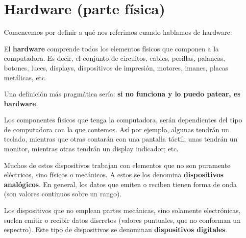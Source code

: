 \section{Hardware (parte física)}

Comencemos por definir a qué nos referimos cuando hablamos de hardware:

\begin{definition}
    El \textbf{hardware} comprende todos los elementos físicos que componen a la
    computadora. Es decir, el conjunto de circuitos, cables, perillas, palancas,
    botones, luces, displays, dispositivos de impresión, motores, imanes, placas
    metálicas, etc.\autocite[vid. p.12]{gookin_2005}
\end{definition}

Una definición más pragmática sería: \textbf{si no funciona y lo puedo patear,
es hardware}.

Los componentes físicos que tenga la computadora, serán dependientes del tipo de
computadora con la que contemos. Así por ejemplo, algunas tendrán un teclado,
mientras que otras contarán con una pantalla táctil; unas tendrán un monitor,
mientras otras tendrán un display indicador; etc.

Muchos de estos dispositivos trabajan con elementos que no son puramente
eléctricos, sino físicos o mecánicos. A estos se los denomina
\textbf{dispositivos analógicos}. En general, los datos que emiten o reciben
tienen forma de onda (son valores continuos sobre un rango).

Los dispositivos que no emplean partes mecánicas, sino solamente electrónicas,
suelen emitir o recibir datos discretos (valores puntuales, que no conforman
un espectro). Este tipo de dispositivos se denominan \textbf{dispositivos
digitales}.

